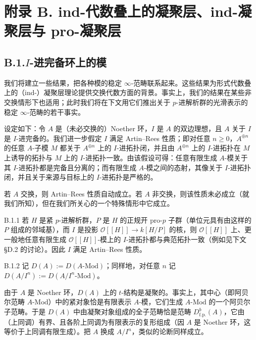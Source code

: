 \section*{附录 B. ind-代数叠上的凝聚层、ind-凝聚层与 pro-凝聚层}

\subsection*{B.1.\quad $I$-进完备环上的模}
我们将建立一些结果，把各种模的稳定 $\infty$-范畴联系起来。这些结果为形式代数叠上的（ind-）凝聚层理论提供交换代数方面的背景。事实上，我们的结果在某些非交换情形下也适用；此时我们将在下文用它们推出关于 $p$-进解析群的光滑表示的稳定 $\infty$-范畴的若干事实。

设定如下：令 $A$ 是（未必交换的）Noether 环，$I$ 是 $A$ 的双边理想，且 $A$ 关于 $I$ 是 $I$-进完备的。我们进一步假定 $I$ 满足 Artin--Rees 性质；即对任意 $n\ge 0$，$A^{\oplus n}$ 的任意 $A$-子模 $M$ 都关于 $A^{\oplus n}$ 上的 $I$-进拓扑闭，并且由 $A^{\oplus n}$ 上的 $I$-进拓扑在 $M$ 上诱导的拓扑与 $M$ 上的 $I$-进拓扑一致。由该假设可得：任意有限生成 $A$-模关于其 $I$-进拓扑都是完备且分离的；而有限生成 $A$-模之间的态射，其像关于 $I$-进拓扑闭，并且关于来源与目标上的 $I$-进拓扑是严格的。

若 $A$ 交换，则 Artin--Rees 性质自动成立。若 $A$ 非交换，则该性质未必成立（就我们所知），但在我们所关心的一个特殊情形中它成立。

\begin{exam}{B.1.1}\label{thm:a4-18-13}
若 $H$ 是紧 $p$-进解析群，$P$ 是 $H$ 的正规开 pro-$p$ 子群（单位元具有由这样的 $P$ 组成的邻域基），而 $I$ 是投影 $\mathcal O[[H]]\to k[H/P]$ 的核，则 $\mathcal O[[H]]$ 上、更一般地任意有限生成 $\mathcal O[[H]]$-模上的 $I$-进拓扑都与典范拓扑一致（例如见下文 §D.2 的讨论）。因此 $I$ 满足 Artin--Rees 性质。
\end{exam}

\begin{defn}{B.1.2}\label{thm:a4-18-14}
记 $D(A):=D(A\text{-}\mathrm{Mod})$；同样地，对任意 $n$ 记 $D(A/I^n):=D(A/I^n\text{-}\mathrm{Mod})$。
\end{defn}

由于 $A$ 是 Noether 环，$D(A)$ 上的 $t$-结构是凝聚的。事实上，其中心（即阿贝尔范畴 $A$-$\mathrm{Mod}$）中的紧对象恰是有限表示 $A$-模，它们生成 $A$-$\mathrm{Mod}$ 的一个阿贝尔子范畴。于是 $D(A)$ 中由凝聚对象组成的全子范畴恰是范畴 $D^b_{\mathrm{f.p.}}(A)$，它由（上同调）有界、且各阶上同调为有限表示的复形组成（因 $A$ 是 Noether 环，这等价于上同调有限生成）。把 $A$ 换成 $A/I^n$，类似的论断同样成立。

